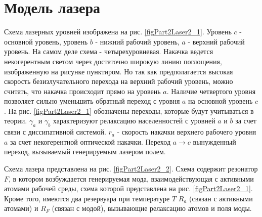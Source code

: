 \section{Модель лазера}

Схема лазерных уровней изображена на
рис. \ref{figPart2Laser2_1}. Уровень $c$ - основной уровень, уровень $b$ -
нижний рабочий уровень, $a$ - верхний рабочий уровень. На самом деле
схема - четырехуровневая. Накачка ведется некогерентным светом через
достаточно широкую линию поглощения, изображенную на рисунке
пунктиром. Но так как предполагается высокая скорость
безизлучательного перехода на верхний рабочий уровень, можно считать,
что накачка происходит прямо на уровень $a$. Наличие четвертого уровня
позволяет сильно уменьшить обратный переход с уровня $a$ на основной
уровень $c$. На рис. \ref{figPart2Laser2_1} обозначены переходы,
которые будут учитываться в теории. $\gamma_a$ и $\gamma_b$
характеризуют релаксацию населенностей с уровней $a$ и $b$ за счет
связи с диссипативной системой. $r_a$ - скорость накачки верхнего
рабочего уровня $a$ за счет некогерентной оптической накачки. Переход
$a \rightarrow c$ вынужденный переход, вызываемый генерируемым лазером
полем.



Схема лазера представлена на рис. \ref{figPart2Laser2_2}. Схема
содержит резонатор $F$, в котором возбуждается генерируемая мода,
взаимодействующая с активными атомами рабочей среды, схема которой
представлена на рис. \ref{figPart2Laser2_1}. Кроме того, имеются два
резервуара при температуре $T$ $R_{a}$ (связан с
активными атомами) и $R_{F}$ (связан с модой), вызывающие релаксацию
атомов и поля моды.



